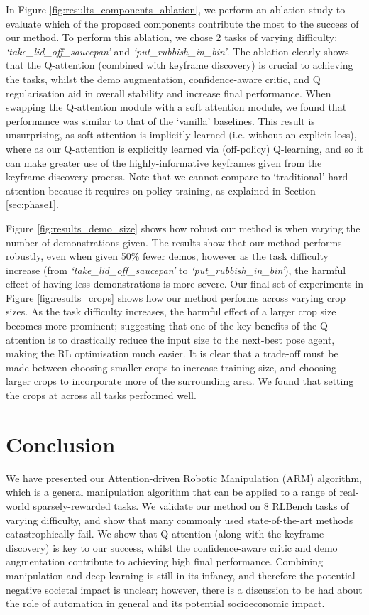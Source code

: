 \documentclass[letterpaper, 10 pt, journal, twoside]{IEEEtran}
\begin{document}
In Figure \ref{fig:results_components_ablation}, we perform an ablation study to evaluate which of the proposed components contribute the most to the success of our method. To perform this ablation, we chose 2 tasks of varying difficulty: \textit{`take\_lid\_off\_saucepan'} and \textit{`put\_rubbish\_in\_bin'}. The ablation clearly shows that the Q-attention (combined with keyframe discovery) is crucial to achieving the tasks, whilst the demo augmentation, confidence-aware critic, and Q regularisation aid in overall stability and increase final performance. When swapping the Q-attention module with a soft attention \cite{xu2015show} module, we found that performance was similar to that of the `vanilla' baselines. This result is unsurprising, as soft attention is implicitly learned (i.e. without an explicit loss), where as our Q-attention is explicitly learned via (off-policy) Q-learning, and so it can make greater use of the highly-informative keyframes given from the keyframe discovery process. Note that we cannot compare to `traditional' hard attention because it requires on-policy training, as explained in Section \ref{sec:phase1}.

Figure \ref{fig:results_demo_size} shows how robust our method is when varying the number of demonstrations given. The results show that our method performs robustly, even when given 50\% fewer demos, however as the task difficulty increase (from \textit{`take\_lid\_off\_saucepan'} to \textit{`put\_rubbish\_in\_bin'}), the harmful effect of having less demonstrations is more severe. Our final set of experiments in Figure \ref{fig:results_crops} shows how our method performs across varying crop sizes. As the task difficulty increases, the harmful effect of a larger crop size becomes more prominent; suggesting that one of the key benefits of the Q-attention is to drastically reduce the input size to the next-best pose agent, making the RL optimisation much easier. It is clear that a trade-off must be made between choosing smaller crops to increase training size, and choosing larger crops to incorporate more of the surrounding area. We found that setting the crops at  across all tasks performed well.

\section{Conclusion}

We have presented our Attention-driven Robotic Manipulation (ARM) algorithm, which is a general manipulation algorithm that can be applied to a range of real-world sparsely-rewarded tasks. We validate our method on 8 RLBench tasks of varying difficulty, and show that many commonly used state-of-the-art methods catastrophically fail. We show that Q-attention (along with the keyframe discovery) is key to our success, whilst the confidence-aware critic and demo augmentation contribute to achieving high final performance. Combining manipulation and deep learning is still in its infancy, and therefore the potential negative societal impact is unclear; however, there is a discussion to be had about the role of automation in general and its potential socioeconomic impact.
\end{document}

